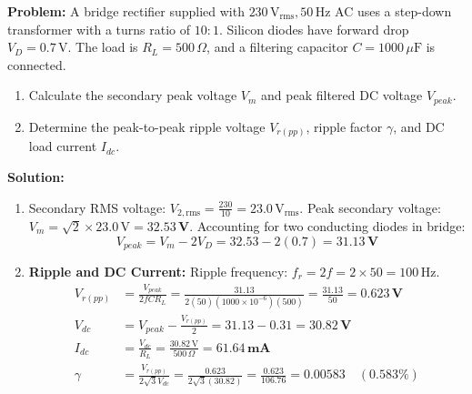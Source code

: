 \begin{examplebox}
\textbf{Problem:} A bridge rectifier supplied with $230\,\text{V}_{\text{rms}}, 50\,\text{Hz}$ AC uses a step-down transformer with a turns ratio of $10:1$. Silicon diodes have forward drop $V_D = 0.7\,\text{V}$. The load is $R_L = 500\,\Omega$, and a filtering capacitor $C = 1000\,\mu\text{F}$ is connected.
\begin{enumerate}[label=(\alph*)]
    \item Calculate the secondary peak voltage $V_m$ and peak filtered DC voltage $V_{peak}$.
    \item Determine the peak-to-peak ripple voltage $V_{r(pp)}$, ripple factor $\gamma$, and DC load current $I_{dc}$.
\end{enumerate}

\textbf{Solution:}
\begin{enumerate}[label=(\alph*)]
    \item Secondary RMS voltage: $V_{2,\text{rms}} = \frac{230}{10} = 23.0\,\text{V}_{\text{rms}}$.
    Peak secondary voltage: $V_m = \sqrt{2} \times 23.0\,\text{V} = \mathbf{32.53\,\text{V}}$.
    Accounting for two conducting diodes in bridge:
    \begin{equation}
        V_{peak} = V_m - 2 V_D = 32.53 - 2(0.7) = \mathbf{31.13\,\text{V}}
    \end{equation}
    \item \textbf{Ripple and DC Current:}
    Ripple frequency: $f_r = 2 f = 2 \times 50 = 100\,\text{Hz}$.
    \begin{align}
        V_{r(pp)} &= \frac{V_{peak}}{2 f C R_L} = \frac{31.13}{2(50)(1000 \times 10^{-6})(500)} = \frac{31.13}{50} = \mathbf{0.623\,\text{V}} \\
        V_{dc} &= V_{peak} - \frac{V_{r(pp)}}{2} = 31.13 - 0.31 = \mathbf{30.82\,\text{V}} \\
        I_{dc} &= \frac{V_{dc}}{R_L} = \frac{30.82\,\text{V}}{500\,\Omega} = \mathbf{61.64\,\text{mA}} \\
        \gamma &= \frac{V_{r(pp)}}{2\sqrt{3} V_{dc}} = \frac{0.623}{2\sqrt{3}(30.82)} = \frac{0.623}{106.76} = \mathbf{0.00583} \quad (0.583\%)
    \end{align}
\end{enumerate}
\end{examplebox}

